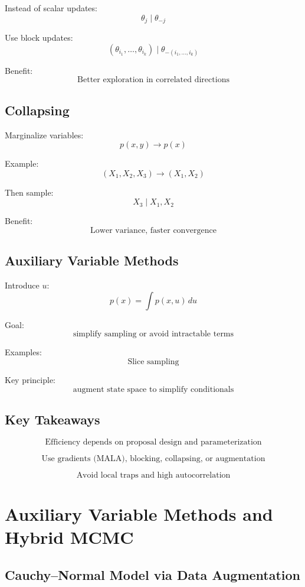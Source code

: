 \documentclass[12pt,oneside]{book}
\numberwithin{equation}{section}
\theoremstyle{definition}
\theoremstyle{plain}
\theoremstyle{remark}
\begin{document}
Instead of scalar updates:
\[
\theta_j \mid \theta_{-j}
\]

Use block updates:
\[
(\theta_{i_1}, \dots, \theta_{i_k}) \mid \theta_{-(i_1,\dots,i_k)}
\]

Benefit:
\[
\text{Better exploration in correlated directions}
\]

\subsection*{Collapsing}

Marginalize variables:
\[
p(x,y) \rightarrow p(x)
\]

Example:
\[
(X_1,X_2,X_3) \rightarrow (X_1,X_2)
\]

Then sample:
\[
X_3 \mid X_1,X_2
\]

Benefit:
\[
\text{Lower variance, faster convergence}
\]

\subsection*{Auxiliary Variable Methods}

Introduce $u$:
\[
p(x) = \int p(x,u)\,du
\]

Goal:
\[
\text{simplify sampling or avoid intractable terms}
\]

Examples:
\[
\text{Slice sampling}
\]

Key principle:
\[
\text{augment state space to simplify conditionals}
\]

\subsection*{Key Takeaways}

\[
\text{Efficiency depends on proposal design and parameterization}
\]

\[
\text{Use gradients (MALA), blocking, collapsing, or augmentation}
\]

\[
\text{Avoid local traps and high autocorrelation}
\]

\section{Auxiliary Variable Methods and Hybrid MCMC}

\subsection*{Cauchy--Normal Model via Data Augmentation}
\end{document}

